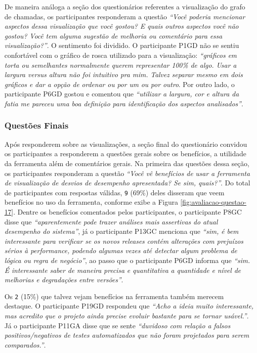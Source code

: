 De maneira análoga a seção dos questionários referentes a visualização do grafo de chamadas, os participantes responderam a questão \textit{``Você poderia mencionar aspectos dessa visualização que você gostou? E quais outros aspectos você não gostou? Você tem alguma sugestão de melhoria ou comentário para essa visualização?''}. O sentimento foi dividido. O participante P1GD não se sentiu confortável com o gráfico de rosca utilizado para a visualização: \textit{``gráficos em torta ou semelhantes normalmente querem representar 100\% de algo. Usar a largura versus altura não foi intuitivo pra mim. Talvez separar mesmo em dois gráficos e dar a opção de ordenar ou por um ou por outro}. Por outro lado, o participante P6GD gostou e comentou que \textit{``utilizar a largura, cor e altura da fatia me pareceu uma boa definição para identificação dos aspectos analisados''}.

\subsubsection{Questões Finais}

Após responderem sobre as visualizações, a seção final do questionário convidou os participantes a responderem a questões gerais sobre os benefícios, a utilidade da ferramenta além de comentários gerais. Na primeira das questões dessa seção, os participantes responderam a questão \textit{``Você vê benefícios de usar a ferramenta de visualização de desvios de desempenho apresentada? Se sim, quais?''}. Do total de participantes com respostas válidas, \texttt{9} (69\%) deles disseram que veem benefícios no uso da ferramenta, conforme exibe a Figura \ref{fig:avaliacao-questao-17}. Dentre os benefícios comentados pelos participantes, o participante P8GC disse que \textit{``aparentemente pode trazer análises mais assertivas do atual desempenho do sistema''}, já o participante P13GC menciona que \textit{``sim, é bem interessante para verificar se os novos releases contém alterações com prejuízos sérios à performance, podendo algumas vezes até detectar algum problema de lógica ou regra de negócio''}, ao passo que o participante P6GD informa que \textit{``sim. É interessante saber de maneira precisa e quantitativa a quantidade e nível de melhorias e degradações entre versões''}.

Os \texttt{2} (15\%) que talvez vejam benefícios na ferramenta também merecem destaque. O participante P19GD respondeu que \textit{``Acho a ideia muito interessante, mas acredito que o projeto ainda precise evoluir bastante para se tornar usável.''}. Já o participante P11GA disse que se sente \textit{``duvidoso com relação a falsos positivos/negativos de testes automatizados que não foram projetados para serem comparados.''}.


